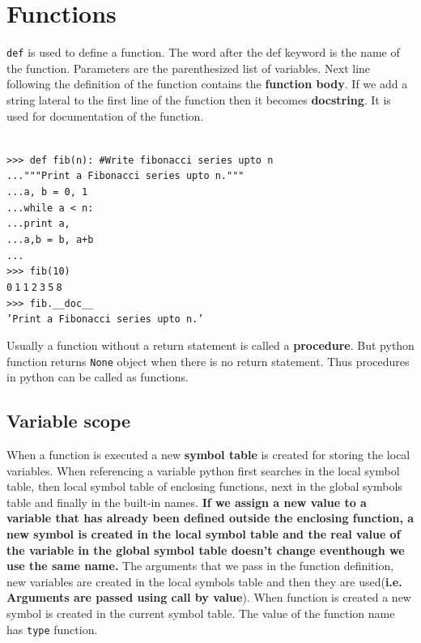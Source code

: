 \documentclass[12pt,a4paper]{article}
\begin{document}
\section{Functions}
\texttt{def} is used to define a function. The word after the def keyword is the name of the function. Parameters are the parenthesized list of variables. Next line following the definition of the function contains the \textbf{function body}. If we add a string lateral to the first line of the function then it becomes \textbf{docstring}. It is used for documentation of the function.

\texttt{\\
>>> def fib(n): \#Write fibonacci series upto n\\
...\hspace{30pt}"""Print a Fibonacci series upto n."""\\
...\hspace{30pt}a, b = 0, 1\\
...\hspace{30pt}while a < n:\\
...\hspace{30pt}\hspace{30pt}print a,\\
...\hspace{30pt}\hspace{30pt}a,b = b, a+b\\
...\\
>>> fib(10)\\
0$\:$1$\:$1$\:$2$\:$3$\:$5$\:$8\\
>>> fib.\_\_doc\_\_\\
'Print a Fibonacci series upto n.'
} 

Usually a function without a return statement is called a \textbf{procedure}. But python function returns \texttt{None} object when there is no return statement. Thus procedures in python can be called as functions.

\subsection{Variable scope}
When a function is executed a new \textbf{symbol table} is created for storing the local variables. When referencing a variable python first searches in the local symbol table, then local symbol table of enclosing functions, next in the global symbols table and finally in the built-in names. \textbf{If we assign a new value to a variable that has already been defined outside the enclosing function, a new symbol is created in the local symbol table and the real value of the variable in the global symbol table doesn't change eventhough we use the same name.} The arguments that we pass in the function definition, new variables are created in the local symbols table and then they are used(\textbf{i.e. Arguments are passed using call by value}). When function is created a new symbol is created in the current symbol table. The value of the function name has \texttt{type} function.
\end{document}
